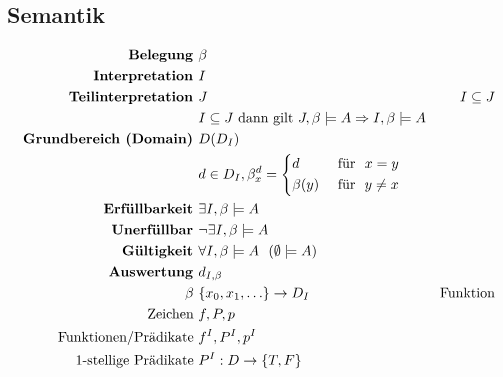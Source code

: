 \documentclass{article}
\begin{document}
		\subsection{Semantik}
			\begin{align*}
				\textbf{Belegung } & \beta \\
				\textbf{Interpretation } & I\\
				\textbf{Teilinterpretation } & J & I \subseteq J\\
				& I \subseteq J \text{ dann gilt } J,\beta \models A \Rightarrow I,\beta \models A\\
				\textbf{Grundbereich (Domain) } & D (D_I)\\
				& d \in D_I, \beta_{x}^{d} = \begin{cases*}d & \text{ f\"ur } $x = y$\\ \beta(y) & \text{ f\"ur } $y \neq x$ \end{cases*}\\
				\textbf{Erf\"ullbarkeit } & \exists I, \beta \models A\\
				\textbf{Unerf\"ullbar } & \neg\exists I,\beta \models A\\
				\textbf{G\"ultigkeit } & \forall I,\beta \models A \ \ (\emptyset \models A)\\
				\textbf{Auswertung } & d_{I, \beta}\\
				\beta \ & \{x_0, x_1, \ldots\} \rightarrow D_I & \text{Funktion}\\
				\text{Zeichen } & f, P, p & \\
				\text{Funktionen/Pr\"adikate } &  f^I, P^I, p^I \\
				1\text{-stellige Pr\"adikate } & P^I: D \rightarrow \{T, F\}\\
			\end{align*}
\end{document}
